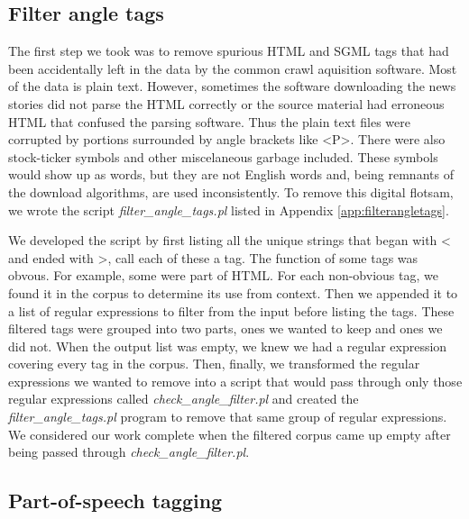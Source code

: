 \documentclass[10pt,letterpaper]{book}
\newcommand{\filename}[1]{\textit{#1}}
\begin{document}
\subsection{Filter angle tags}

The first step we took was to remove spurious HTML and SGML tags that had been accidentally left in the data by the common crawl aquisition software. Most of the data is plain text. However, sometimes the software downloading the news stories did not parse the HTML correctly or the source material had erroneous HTML that confused the parsing software. Thus the plain text files were corrupted by portions surrounded by angle brackets like <P>. There were also stock-ticker symbols and other miscelaneous garbage included. These symbols would show up as words, but they are not English words and, being remnants of the download algorithms, are used inconsistently. To remove this digital flotsam, we wrote the script \filename{filter\_angle\_tags.pl} listed in Appendix \ref{app:filterangletags}.

We developed the script by first listing all the unique strings that began with < and ended with >, call each of these a tag. The function of some tags was obvous. For example, some were part of HTML. For each non-obvious tag, we found it in the corpus to determine its use from context. Then we appended it to a list of regular expressions to filter from the input before listing the tags. These filtered tags were grouped into two parts, ones we wanted to keep and ones we did not. When the output list was empty, we knew we had a regular expression covering every tag in the corpus. Then, finally, we transformed the regular expressions we wanted to remove into a script that would pass through only those regular expressions called \filename{check\_angle\_filter.pl} and created the \filename{filter\_angle\_tags.pl} program to remove that same group of regular expressions. We considered our work complete when the filtered corpus came up empty after being passed through \filename{check\_angle\_filter.pl}.

\subsection{Part-of-speech tagging}
\end{document}
